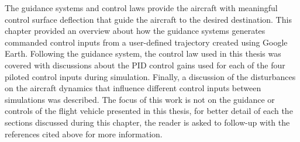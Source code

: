 The guidance systems and control laws provide the aircraft with meaningful control surface deflection that guide the aircraft to the desired destination. This chapter provided an overview about how the guidance systems generates commanded control inputs from a user-defined trajectory created using Google Earth. Following the guidance system, the control law used in this thesis was covered with discussions about the PID control gains used for each of the four piloted control inputs during simulation. Finally, a discussion of the disturbances on the aircraft dynamics that influence different control inputs between simulations was described. The focus of this work is not on the guidance or controls of the flight vehicle presented in this thesis, for better detail of each the sections discussed during this chapter, the reader is asked to follow-up with the references cited above for more information.